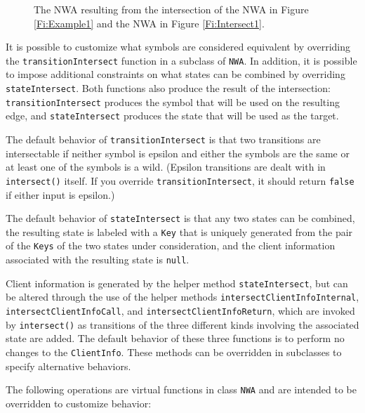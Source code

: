 \begin{figure}[htbp]
  \centering
  \caption{The NWA resulting from the intersection of the NWA in Figure
    \ref{Fi:Example1} and the NWA in Figure \ref{Fi:Intersect1}.}
  \label{Fi:Intersect2}
\end{figure}

It is possible to customize what symbols are considered equivalent by
overriding the \texttt{transitionIntersect} function in a subclass of
\texttt{NWA}. In addition, it is possible to impose additional constraints on
what states can be combined by overriding \texttt{stateIntersect}. Both
functions also produce the result of the intersection:
\texttt{transitionIntersect} produces the symbol that will be used on the
resulting edge, and \texttt{stateIntersect} produces the state that will be
used as the target.

The default behavior of
\texttt{transitionIntersect} is that two transitions are intersectable if
neither symbol is epsilon and either the symbols are the same or at least one of
the symbols is a wild. (Epsilon transitions are dealt with in
\texttt{intersect()} itself. If you override \texttt{transitionIntersect}, it
should return \texttt{false} if either input is epsilon.)

The default behavior of \texttt{stateIntersect} is that any two
states can be combined, the resulting state is labeled with a
\texttt{Key} that is uniquely generated from the pair of the \texttt{Keys} of
the two states under consideration, and the client information associated
with the resulting state is \texttt{null}.


Client information is generated by the helper method \texttt{stateIntersect},
but can be altered through the use of the helper methods
\texttt{intersectClientInfoInternal}, \texttt{intersectClientInfoCall}, and
\texttt{intersect\-Client\-InfoReturn}, which are invoked by
\texttt{intersect()} as transitions of the three different kinds involving the
associated state are added.  The default behavior of these three functions is
to perform no changes to the \texttt{ClientInfo}.  These methods can be
overridden in subclasses to specify alternative behaviors.

\goodbreak
The following operations are virtual functions in class \texttt{NWA} and are intended
to be overridden to customize behavior:

